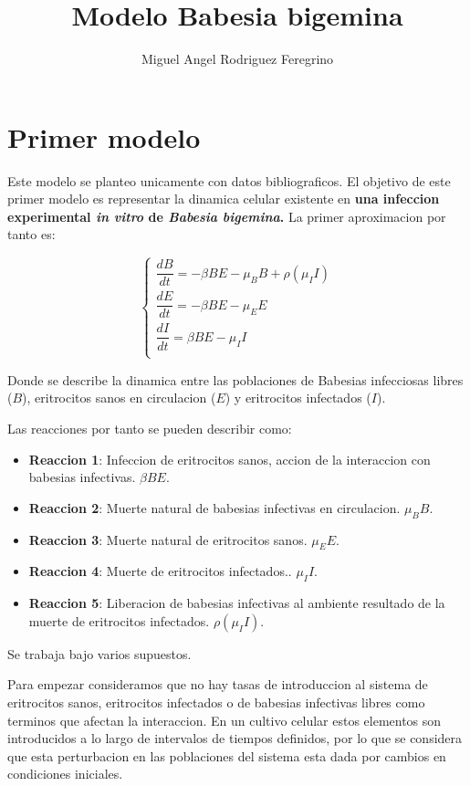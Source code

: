 \documentclass[11pt,a4paper]{article}
\author{Miguel Angel Rodriguez Feregrino}
\title{Modelo Babesia bigemina}
\begin{document}
\maketitle


\section{Primer modelo}

Este modelo se planteo unicamente con datos bibliograficos. El objetivo de este primer modelo es representar la dinamica celular existente en \textbf{una infeccion experimental \textit{in vitro} de \textit{Babesia bigemina}.} La primer aproximacion por tanto es:

\begin{equation} 
\left\{\begin{array}{l}
\dfrac{dB}{dt}
=
- \beta BE - \mu_B B + \rho (\mu_I I)
\\
\dfrac{dE}{dt}
=
- \beta BE -\mu_E E 
\\
\dfrac{dI}{dt}
=
\beta BE - \mu_I I
\\
    \end{array}\right.
\end{equation}

Donde se describe la dinamica entre las poblaciones de Babesias infecciosas libres ($B$), eritrocitos sanos en circulacion ($E$) y eritrocitos infectados ($I$).

Las reacciones por tanto se pueden describir como:

\begin{itemize}
\item \textbf{Reaccion 1}: Infeccion de eritrocitos sanos, accion de la interaccion con babesias infectivas. $\beta BE$.
\item \textbf{Reaccion 2}: Muerte natural de babesias infectivas en circulacion. $\mu_B B$.
\item \textbf{Reaccion 3}: Muerte natural de eritrocitos sanos. $\mu_E E$.
\item \textbf{Reaccion 4}: Muerte de eritrocitos infectados.. $\mu_I I$.
\item \textbf{Reaccion 5}: Liberacion de babesias infectivas al ambiente resultado de la muerte de eritrocitos infectados. $\rho (\mu_I I)$.

\end{itemize}

Se trabaja bajo varios supuestos.

Para empezar consideramos que no hay tasas de introduccion al sistema de eritrocitos sanos, eritrocitos infectados o de babesias infectivas libres como terminos que afectan la interaccion. En un cultivo celular estos elementos son introducidos a lo largo de intervalos de tiempos definidos, por lo que se considera que esta perturbacion en las poblaciones del sistema esta dada por cambios en condiciones iniciales.
\end{document}
